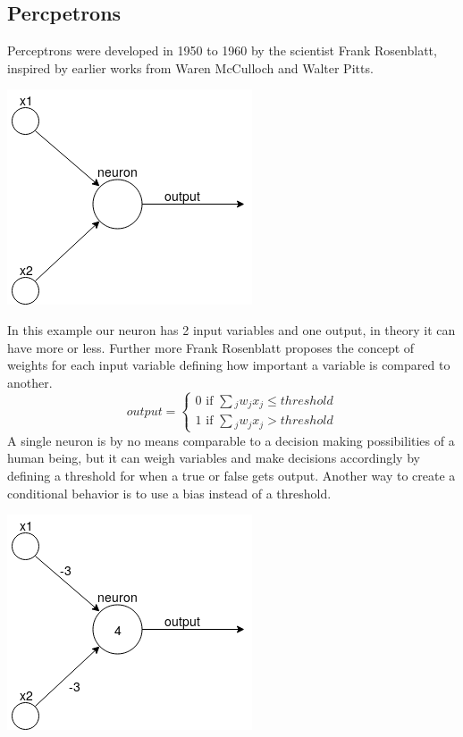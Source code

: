 \subsection{Percpetrons}
Perceptrons were developed in 1950 to 1960 by the scientist Frank Rosenblatt, inspired by earlier works from Waren McCulloch and Walter Pitts.
\begin{center}
    \includegraphics[scale=0.5]{images/simple_neuron.png}
\end{center}
In this example our neuron has 2 input variables and one output, in theory it can have more or less. Further more Frank Rosenblatt proposes
the concept of weights for each input variable defining how important a variable is compared to another.\\
\vspace{0.5cm}
    \begin{equation*}
        output=
        \begin{cases}
            0 \text{ if } \sum{_j}{w_jx_j \le threshold}\\
            1 \text{ if } \sum{_j}{w_jx_j > threshold}
        \end{cases}
    \end{equation*}
\vspace{0.5cm}
A single neuron is by no means comparable to a decision making possibilities of a human being, but it can weigh variables and make decisions
accordingly by defining a threshold for when a true or false gets output. Another way to create a conditional behavior is to use a bias
instead of a threshold.
\begin{center}
    \includegraphics[scale=0.5]{images/simple_neuron_bias.png}
\end{center}
